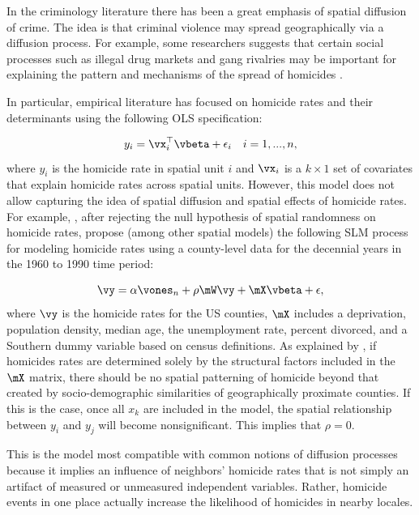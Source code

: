 \documentclass[english,12pt]{book}\usepackage[]{graphicx}\usepackage[]{xcolor}
\begin{document}
\begin{example}
In the criminology literature there has been a great emphasis of spatial diffusion of crime. The idea is that criminal violence may spread geographically via a diffusion process. For example, some researchers suggests that certain social processes such as illegal drug markets and gang rivalries may be important for explaining the pattern and mechanisms of the spread of homicides \citep{cohen1999diffusion}. 

In particular, empirical literature has focused on homicide rates and their determinants using the following OLS specification:

\begin{equation*}
y_i = \vx_i^\top\vbeta + \epsilon_i\quad i = 1, ..., n,
\end{equation*}
%
where $y_i$ is the homicide rate in spatial unit $i$ and $\vx_i$ is a $k\times 1$ set of covariates that explain homicide rates across spatial units. However, this model does not allow capturing the idea of spatial diffusion and spatial effects of homicide rates. For example, \cite{baller2001structural}, after rejecting the null hypothesis of spatial randomness on homicide rates, propose (among other spatial models) the following SLM process for modeling homicide rates using a county-level data for the decennial years in the 1960 to 1990 time period:

\begin{equation*}
\vy  =  \alpha \vones_n + \rho \mW\vy + \mX\vbeta + \epsilon,
\end{equation*}
%
where $\vy$ is the homicide rates for the US counties, $\mX$ includes a deprivation, population density, median age, the unemployment rate, percent divorced, and a Southern dummy variable based on census definitions.  As explained by \cite{baller2001structural}, if homicides rates are determined solely by the structural factors included in the $\mX$ matrix, there should be no spatial patterning of homicide beyond that created by socio-demographic similarities of geographically proximate counties. If this is the case, once all $x_k$ are included in the model, the spatial relationship between $y_i$ and $y_j$ will become nonsignificant. This implies that $\rho = 0$.

This is the model most compatible with common notions of diffusion processes because it implies an influence of neighbors’ homicide rates that is not simply an artifact of measured or unmeasured independent variables. Rather, homicide events in one place actually increase the likelihood of homicides in nearby locales. 
\end{example}
\end{document}
